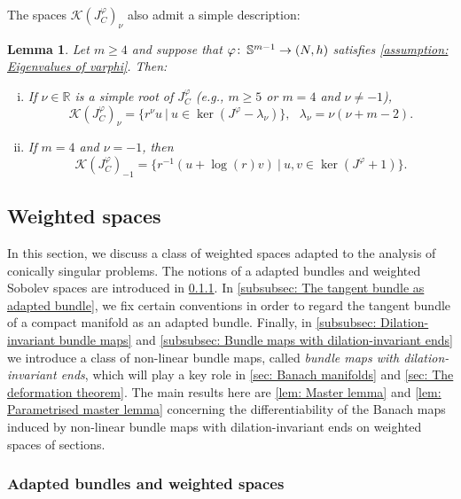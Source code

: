 \documentclass{article}
\numberwithin{equation}{section}        %
\theoremstyle{bfnote}
\newtheorem{lem}[thm]{Lemma}                %
\theoremstyle{definition}
\theoremstyle{bfremark}
\newcommand{\col}{\colon \thinspace}        %
\newcommand{\R}{\mathbb{R}}                 %
\newcommand{\Sp}{\mathbb{S}}                %
\begin{document}
The spaces $\mathcal{K}(J^\varphi_C)_\nu$ also admit a simple description:

\begin{lem}     \label{lem: the space of polyhomogeneous kernel elements}
    Let $m \geq 4$ and suppose that $\varphi \col \Sp^{m-1} \rightarrow (N,h)$ satisfies \cref{assumption: Eigenvalues of varphi}. Then:
    \begin{enumerate}[(i)]
        \item If $\nu \in \R$ is a simple root of $J^\varphi_C$ (e.g., $m \geq 5$ or $m=4$ and $\nu \neq -1$), 
        \begin{equation*}
            \mathcal{K}(J^\varphi_C)_\nu = \{ r^\nu u ~ | ~ u \in \ker(J^\varphi - \lambda_\nu)\}, ~~~ \lambda_\nu = \nu(\nu+ m-2).
        \end{equation*}
        \item If $m = 4$ and $\nu = -1$, then
        \begin{equation*}
            \mathcal{K}(J^\varphi_C)_{-1} = \{ r^{-1}(u+\log(r) v) ~ | ~ u,v \in \ker(J^\varphi+1) \} .
        \end{equation*}
    \end{enumerate}
\end{lem}


    \subsection{Weighted spaces}        \label{subsec: Weighted spaces}

In this section, we discuss a class of weighted spaces adapted to the analysis of conically singular problems. The notions of a adapted bundles and weighted Sobolev spaces are introduced in \cref{subsubsec: adapted bundles}. In \cref{subsubsec: The tangent bundle as adapted bundle}, we fix certain conventions in order to regard the tangent bundle of a compact manifold as an adapted bundle. Finally, in \cref{subsubsec: Dilation-invariant bundle maps} and \cref{subsubsec: Bundle maps with dilation-invariant ends} we introduce a class of non-linear bundle maps, called \emph{bundle maps with dilation-invariant ends}, which will play a key role in \cref{sec: Banach manifolds} and \cref{sec: The deformation theorem}. The main results here are \cref{lem: Master lemma} and \cref{lem: Parametrised master lemma} concerning the differentiability of the Banach maps induced by non-linear bundle maps with dilation-invariant ends on weighted spaces of sections.


    \subsubsection{Adapted bundles and weighted spaces}     \label{subsubsec: adapted bundles}
\end{document}

